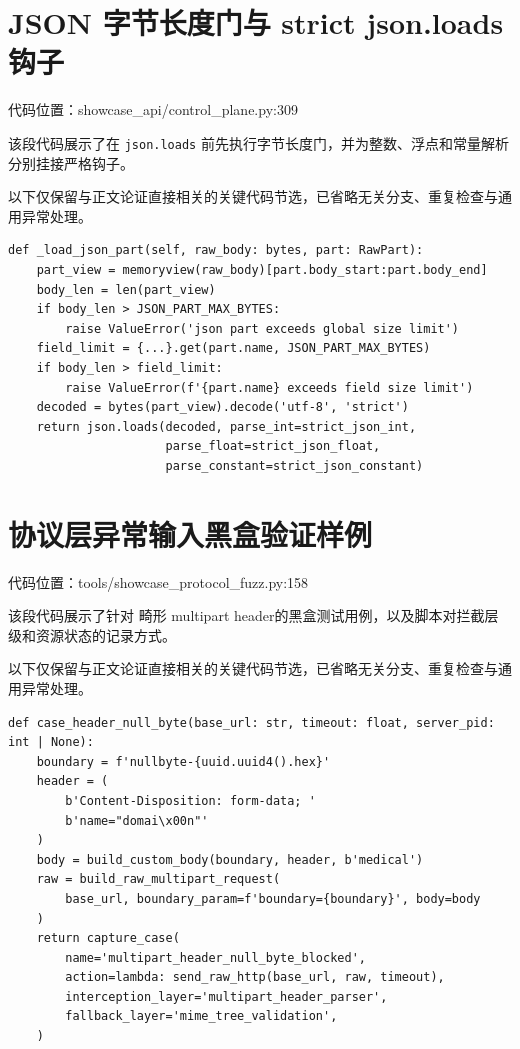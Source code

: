 \section{JSON 字节长度门与 strict json.loads 钩子}

代码位置：showcase\_api/control\_plane.py:309

该段代码展示了在 \texttt{json.loads} 前先执行字节长度门，并为整数、浮点和常量解析分别挂接严格钩子。

以下仅保留与正文论证直接相关的关键代码节选，已省略无关分支、重复检查与通用异常处理。

\begin{lstlisting}
def _load_json_part(self, raw_body: bytes, part: RawPart):
    part_view = memoryview(raw_body)[part.body_start:part.body_end]
    body_len = len(part_view)
    if body_len > JSON_PART_MAX_BYTES:
        raise ValueError('json part exceeds global size limit')
    field_limit = {...}.get(part.name, JSON_PART_MAX_BYTES)
    if body_len > field_limit:
        raise ValueError(f'{part.name} exceeds field size limit')
    decoded = bytes(part_view).decode('utf-8', 'strict')
    return json.loads(decoded, parse_int=strict_json_int,
                      parse_float=strict_json_float,
                      parse_constant=strict_json_constant)
\end{lstlisting}

\section{协议层异常输入黑盒验证样例}

代码位置：tools/showcase\_protocol\_fuzz.py:158

该段代码展示了针对 畸形 multipart header的黑盒测试用例，以及脚本对拦截层级和资源状态的记录方式。

以下仅保留与正文论证直接相关的关键代码节选，已省略无关分支、重复检查与通用异常处理。

\begin{lstlisting}
def case_header_null_byte(base_url: str, timeout: float, server_pid: int | None):
    boundary = f'nullbyte-{uuid.uuid4().hex}'
    header = (
        b'Content-Disposition: form-data; '
        b'name="domai\x00n"'
    )
    body = build_custom_body(boundary, header, b'medical')
    raw = build_raw_multipart_request(
        base_url, boundary_param=f'boundary={boundary}', body=body
    )
    return capture_case(
        name='multipart_header_null_byte_blocked',
        action=lambda: send_raw_http(base_url, raw, timeout),
        interception_layer='multipart_header_parser',
        fallback_layer='mime_tree_validation',
    )
\end{lstlisting}
